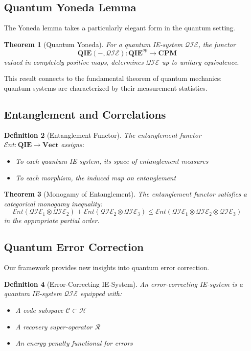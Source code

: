 \documentclass[12pt]{article}
\newtheorem{theorem}{Theorem}[section]
\newtheorem{definition}[theorem]{Definition}
\begin{document}
\subsection{Quantum Yoneda Lemma}

The Yoneda lemma takes a particularly elegant form in the quantum setting.

\begin{theorem}[Quantum Yoneda]
For a quantum IE-system $\mathcal{QIE}$, the functor
\[\mathbf{QIE}(-, \mathcal{QIE}): \mathbf{QIE}^{op} \to \mathbf{CPM}\]
valued in completely positive maps, determines $\mathcal{QIE}$ up to unitary equivalence.
\end{theorem}

This result connects to the fundamental theorem of quantum mechanics: quantum systems are characterized by their measurement statistics.

\subsection{Entanglement and Correlations}

\begin{definition}[Entanglement Functor]
The entanglement functor $\mathcal{E}nt: \mathbf{QIE} \to \mathbf{Vect}$ assigns:
\begin{itemize}
\item To each quantum IE-system, its space of entanglement measures
\item To each morphism, the induced map on entanglement
\end{itemize}
\end{definition}

\begin{theorem}[Monogamy of Entanglement]
The entanglement functor satisfies a categorical monogamy inequality:
\[\mathcal{E}nt(\mathcal{QIE}_1 \otimes \mathcal{QIE}_2) + \mathcal{E}nt(\mathcal{QIE}_2 \otimes \mathcal{QIE}_3) \leq \mathcal{E}nt(\mathcal{QIE}_1 \otimes \mathcal{QIE}_2 \otimes \mathcal{QIE}_3)\]
in the appropriate partial order.
\end{theorem}

\subsection{Quantum Error Correction}

Our framework provides new insights into quantum error correction.

\begin{definition}[Error-Correcting IE-System]
An error-correcting IE-system is a quantum IE-system $\mathcal{QIE}$ equipped with:
\begin{itemize}
\item A code subspace $\mathcal{C} \subset \mathcal{H}$
\item A recovery super-operator $\mathcal{R}$
\item An energy penalty functional for errors
\end{itemize}
\end{definition}
\end{document}
